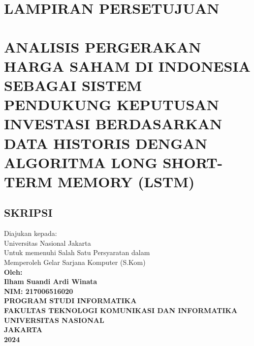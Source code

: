 \documentclass[12pt]{report}
\begin{document}

\titleformat{\chapter}[hang]{\fontsize{14}{14}\centering\bfseries}{\thechapter}{}{}
\chapter*{LAMPIRAN PERSETUJUAN}
\pagebreak

\titleformat{\section}[hang]{\fontsize{12}{12}\bfseries\centering}{\textbf{\thesection}}{1pc}{}
\chapter*{ANALISIS PERGERAKAN HARGA SAHAM DI INDONESIA SEBAGAI SISTEM PENDUKUNG KEPUTUSAN INVESTASI BERDASARKAN DATA HISTORIS DENGAN ALGORITMA LONG SHORT-TERM MEMORY (LSTM)}
\vspace{2cm}
\section*{SKRIPSI}
\vspace{2cm}
\begin{center}
	Diajukan kepada:\\
	Universitas Nasional Jakarta \\
	Untuk memenuhi Salah Satu Persyaratan dalam \\
	Memperoleh Gelar Sarjana Komputer (S.Kom) \\
	\vspace{2cm}
	\textbf{Oleh:}\\
	\textbf{Ilham Suandi Ardi Winata}\\
	\textbf{NIM: 217006516020}\\
	\vfill
	{\fontsize{14}{16}\selectfont \textbf{PROGRAM STUDI INFORMATIKA}} \\
	{\fontsize{13}{16}\selectfont \textbf{FAKULTAS TEKNOLOGI KOMUNIKASI DAN INFORMATIKA}} \\
	{\fontsize{13}{16}\selectfont \textbf{UNIVERSITAS NASIONAL}} \\
	{\fontsize{13}{16}\selectfont \textbf{JAKARTA}} \\
	{\fontsize{13}{16}\selectfont \textbf{2024}}
\end{center}
\pagebreak
\end{document}
